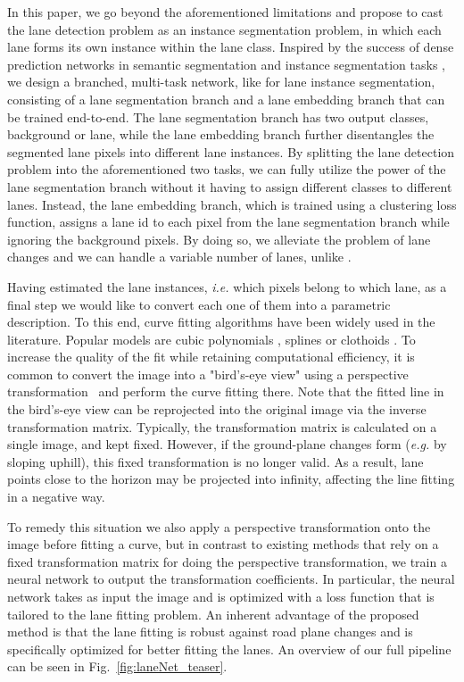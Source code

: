 \documentclass[letterpaper, 10 pt, conference]{ieeeconf}
\newcommand{\eg}{\textit{e.g. }}
\newcommand{\ie}{\textit{i.e. }}
\begin{document}
In this paper, we go beyond the aforementioned limitations and propose to cast the lane detection problem as an instance segmentation problem, in which each lane forms its own instance within the lane class.
Inspired by the success of dense prediction networks in semantic segmentation \cite{Long15, Noh15, Ronneberger15, Chen16}
and instance segmentation tasks \cite{Zhang15, Dai16, Romera16, Bai16, He17, Brabandere17},
we design a branched, multi-task network, like \cite{Neven17} for lane instance segmentation, consisting of a lane segmentation branch and a lane embedding branch that can be trained end-to-end.
The lane segmentation branch has two output classes, background or lane, while the lane embedding branch further disentangles the segmented lane pixels into different lane instances.
By splitting the lane detection problem into the aforementioned two tasks, we can fully utilize the power of the lane segmentation branch without it having to assign different classes to different lanes. 
Instead, the lane embedding branch, which is trained using a clustering loss function, assigns a lane id to each pixel from the lane segmentation branch while ignoring the background pixels.
By doing so, we alleviate the problem of lane changes and we can handle a variable number of lanes, unlike \cite{Kim17}.

Having estimated the lane instances, \ie which pixels belong to which lane, as a final step we would like to convert each one of them into a parametric description. 
To this end, curve fitting algorithms have been widely used in the literature.
Popular models are cubic polynomials \cite{Smuda06,Loose09}, splines \cite{Aly08} or clothoids \cite{Gackstatter10}.
To increase the quality of the fit while retaining computational efficiency, it is common to convert the image into a "bird's-eye view" using a perspective transformation~\cite{Bertozzi96} and perform the curve fitting there. 
Note that the fitted line in the bird's-eye view can be reprojected into the original image via the inverse transformation matrix.
Typically, the transformation matrix is calculated on a single image, and kept fixed. 
However, if the ground-plane changes form (\eg by sloping uphill), this fixed transformation is no longer valid. 
As a result, lane points close to the horizon may be projected into infinity, affecting the line fitting in a negative way.

To remedy this situation we also apply a perspective transformation onto the image before fitting a curve, but in contrast to existing methods that rely on a fixed transformation matrix for doing the perspective transformation, we train a neural network to output the transformation coefficients.
In particular, the neural network takes as input the image and is optimized with a loss function that is tailored to the lane fitting problem.
An inherent advantage of the proposed method is that the lane fitting is robust against road plane changes and is specifically optimized for better fitting the lanes. 
An overview of our full pipeline can be seen in Fig.~\ref{fig:laneNet_teaser}.
\end{document}
